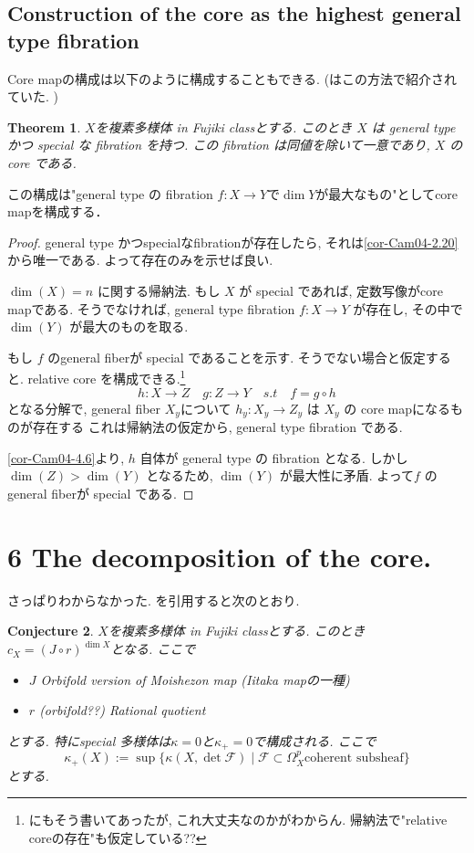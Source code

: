 \documentclass[dvipdfmx,a4paper,11pt]{article} %
\newtheorem{thm}{Theorem}[section]
\newtheorem{conj}[thm]{Conjecture}
\theoremstyle{definition}
\theoremstyle{remark}
\numberwithin{equation}{section}
\begin{document}
\subsection{Construction of the core as the highest general type fibration \cite[5.7]{Cam04}}

Core mapの構成は以下のように構成することもできる. (\cite{Voi}はこの方法で紹介されていた. )

\begin{thm}\cite[Theorem 5.16]{Cam04}
$X$を複素多様体 in Fujiki classとする. 
このとき \( X \) は general type かつ special な fibration を持つ.
この fibration は同値を除いて一意であり, \( X \) の core である.
\end{thm}
この構成は"general type の fibration \( f : X \to Y \)で$\dim Y$が最大なもの"としてcore mapを構成する． 
\begin{proof}
 general type かつspecialなfibrationが存在したら, それは\ref{cor-Cam04-2.20}から唯一である. よって存在のみを示せば良い. 

\( \dim(X)=n \) に関する帰納法. 
もし \( X \) が special であれば, 定数写像がcore mapである. 
そうでなければ, general type fibration \( f : X \to Y \) が存在し, その中で \( \dim(Y) \) が最大のものを取る.

もし \( f \) のgeneral fiberが special であることを示す. 
そうでない場合と仮定すると. 
relative core を構成できる.\footnote{\cite{Voi}にもそう書いてあったが, これ大丈夫なのかがわからん. 帰納法で"relative coreの存在"も仮定している??}
\[
h : X \to Z  \quad g : Z \to Y \quad s.t 
\quad 
f = g \circ h
\]
となる分解で, general fiber $X_y$について \( h_y : X_y \to Z_y \) は \( X_y \) の core mapになるものが存在する 
これは帰納法の仮定から, general type fibration である.


\ref{cor-Cam04-4.6}より,  \( h \) 自体が general type の fibration となる. 
しかし \( \dim(Z) > \dim(Y) \) となるため, \( \dim(Y) \) が最大性に矛盾. 
よって\( f \) のgeneral fiberが special である. 
\end{proof}

\section{ 6 The decomposition of the core.}

さっぱりわからなかった. 
\cite{CW15}を引用すると次のとおり.
\begin{conj}\cite[Conjecture 2.4]{CW15}
\label{conj-CW15-2.4}
$X$を複素多様体 in Fujiki classとする. 
このとき$c_X =(J \circ r)^{\dim X}$となる. ここで
\begin{itemize}
\item $J$ Orbifold version of Moishezon map (Iitaka mapの一種)
\item $r$ (orbifold??) Rational quotient 
\end{itemize}
とする. 特にspecial 多様体は$\kappa=0$と$\kappa_{+}=0$で構成される. 
ここで
$$
\kappa_{+}(X):=\sup\{ \kappa(X, \det\mathcal{F}) \mid \mathcal{F} \subset \Omega_{X}^{p} \text{coherent subsheaf}\}
$$
とする. 
\end{conj}
\end{document}

